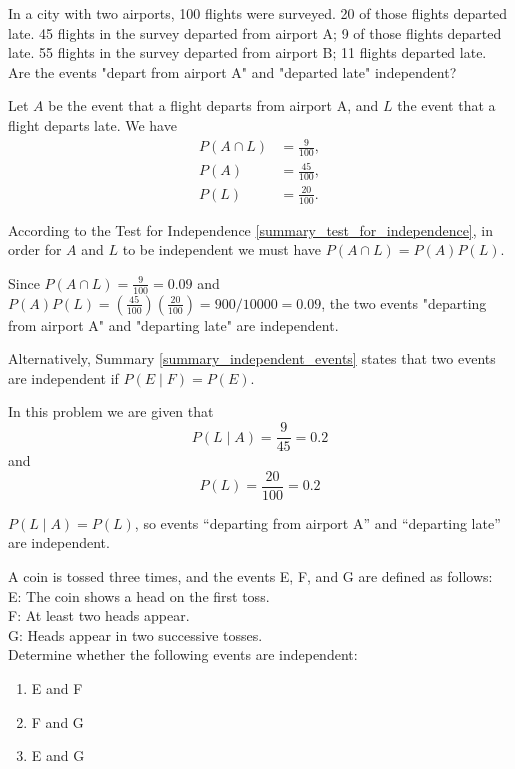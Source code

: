 \begin{example}\label{example_independence_flights}
    In a city with two airports, 100 flights were surveyed. 20 of those flights departed late. 45 flights in the survey departed from airport A; 9 of those flights departed late. 55 flights in the survey departed from airport B; 11 flights departed late. Are the events "depart from airport A" and "departed late" independent?
\end{example}

\begin{solution}
    Let \( A \) be the event that a flight departs from airport A, and \( L \) the event that a flight departs late. We have
    \begin{align*}
        P(A \cap L) & = \frac{9}{100},  \\
        P(A)        & = \frac{45}{100}, \\
        P(L)        & = \frac{20}{100}.
    \end{align*}

    According to the Test for Independence \ref{summary_test_for_independence}, in order for $A$ and $L$ to be independent we must have \( P(A \cap L) = P(A)P(L) \).

    Since \( P(A \cap L) = \frac{9}{100} = 0.09 \) and \( P(A)P(L) = \left(\frac{45}{100}\right)\left(\frac{20}{100}\right) = 900/10000 = 0.09 \), the two events "departing from airport A" and "departing late" are independent.

    Alternatively, Summary \ref{summary_independent_events} states that two events are independent if \( P(E \mid F) = P(E) \).

    In this problem we are given that
    \[ P(L \mid A) = \frac{9}{45} = 0.2 \]
    and
    \[ P(L) = \frac{20}{100} = 0.2 \]

    \( P(L \mid A) = P(L) \), so events ``departing from airport A'' and ``departing late'' are independent.

\end{solution}


\begin{example}
    A coin is tossed three times, and the events E, F, and G are defined as follows: \\
    E: The coin shows a head on the first toss. \\
    F: At least two heads appear. \\
    G: Heads appear in two successive tosses. \\
    Determine whether the following events are independent: \\
    \begin{enumerate}
        \item E and F
        \item F and G
        \item E and G
    \end{enumerate}
\end{example}

